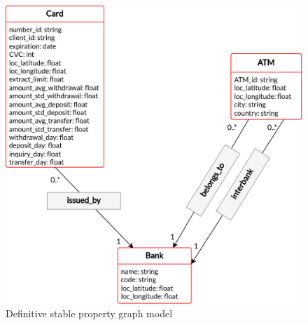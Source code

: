 \begin{figure}[h]
  \centering
  \includegraphics[scale = 0.7]{images/1-DataModel/PG-stable-behavior-cards.png}
  \caption{Definitive stable property graph model}
  \label{img:pg-stable-def}
\end{figure}

